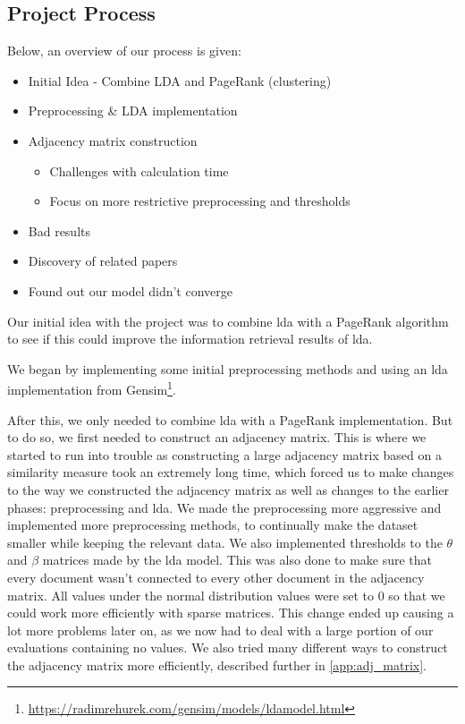 \subsection{Project Process}
Below, an overview of our process is given:
\begin{itemize}
	\item Initial Idea - Combine LDA and PageRank (clustering)
	\item Preprocessing \& LDA implementation
	\item Adjacency matrix construction
	\begin{itemize}
		\item Challenges with calculation time
		\item Focus on more restrictive preprocessing and thresholds
	\end{itemize}
	\item Bad results
	\item Discovery of related papers
	\item Found out our model didn't converge
\end{itemize}

Our initial idea with the project was to combine \gls{lda} with a PageRank algorithm to see if this could improve the information retrieval results of \gls{lda}.

We began by implementing some initial preprocessing methods and using an \gls{lda} implementation from Gensim\footnote{\url{https://radimrehurek.com/gensim/models/ldamodel.html}}.

After this, we only needed to combine \gls{lda} with a PageRank implementation. 
But to do so, we first needed to construct an adjacency matrix. 
This is where we started to run into trouble as constructing a large adjacency matrix based on a similarity measure took an extremely long time, which forced us to make changes to the way we constructed the adjacency matrix as well as changes to the earlier phases: preprocessing and \gls{lda}.
We made the preprocessing more aggressive and implemented more preprocessing methods, to continually make the dataset smaller while keeping the relevant data.
We also implemented thresholds to the $\theta$ and $\beta$ matrices made by the \gls{lda} model.
This was also done to make sure that every document wasn't connected to every other document in the adjacency matrix.
All values under the normal distribution values were set to 0 so that we could work more efficiently with sparse matrices.
This change ended up causing a lot more problems later on, as we now had to deal with a large portion of our evaluations containing no values. 
We also tried many different ways to construct the adjacency matrix more efficiently, described further in \autoref{app:adj_matrix}.

